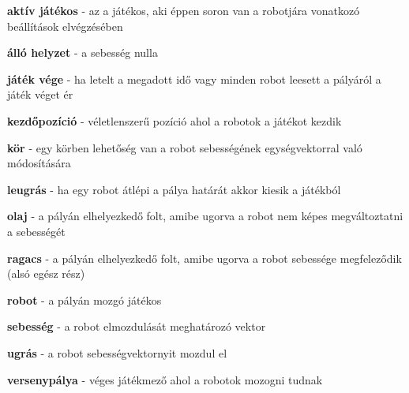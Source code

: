 \textbf{aktív játékos} - az a játékos, aki éppen soron van a robotjára vonatkozó beállítások elvégzésében

\textbf{álló helyzet} - a sebesség nulla

\textbf{játék vége} - ha letelt a megadott idő vagy minden robot leesett a pályáról a játék véget ér

\textbf{kezdőpozíció} - véletlenszerű pozíció ahol a robotok a játékot kezdik

\textbf{kör} - egy körben lehetőség van a robot sebességének egységvektorral való módosítására

\textbf{leugrás} - ha egy robot átlépi a pálya határát akkor kiesik a játékból

\textbf{olaj} - a pályán elhelyezkedő folt, amibe ugorva a robot nem képes megváltoztatni a sebességét

\textbf{ragacs} - a pályán elhelyezkedő folt, amibe ugorva a robot sebessége megfeleződik (alsó egész rész)

\textbf{robot} - a pályán mozgó játékos

\textbf{sebesség} - a robot elmozdulását meghatározó vektor

\textbf{ugrás} - a robot sebességvektornyit mozdul el

\textbf{versenypálya} - véges játékmező ahol a robotok mozogni tudnak
